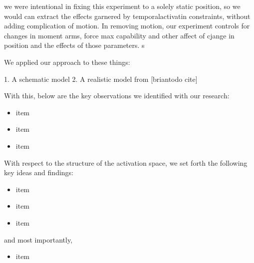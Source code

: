 we were intentional in fixing this experiment to a solely static position, so we would can extract the effects garnered by temporalactivatin constraints, without adding complication of motion.
In removing motion, our experiment controls for changes in moment arms, force max capability and other affect of cjange in position and the effects of those parameters.
s


We applied our approach to these things:

1. A schematic model
2. A realistic model from [briantodo cite]

With this, below are the key observations we identified with our research:
\begin{itemize}
\item{item}
\item{item}
\item{item}
\end{itemize}

With respect to the structure of the activation space, we set forth the following key ideas and findings:
\begin{itemize}
\item{item}
\item{item}
\item{item}
\end{itemize}
and most importantly,
\begin{itemize}
\item{item}
\end{itemize}
